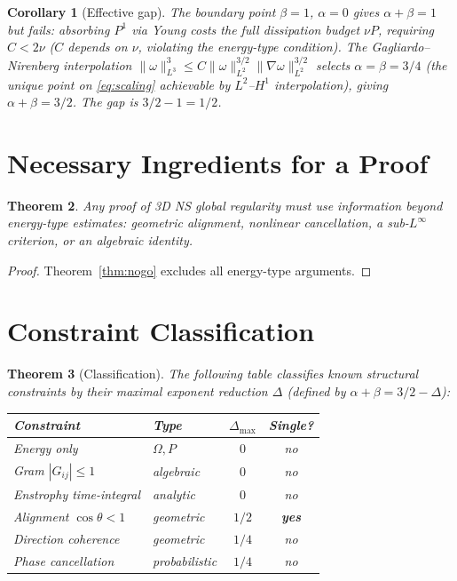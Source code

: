 \documentclass[12pt]{article}
\newtheorem{theorem}{Theorem}[section]
\newtheorem{corollary}[theorem]{Corollary}
\begin{document}
\begin{corollary}[Effective gap]\label{cor:gap}
The boundary point $\beta = 1$, $\alpha = 0$
gives $\alpha + \beta = 1$ but fails: absorbing
$P^1$ via Young costs the full dissipation
budget $\nu P$, requiring $C < 2\nu$
($C$ depends on $\nu$, violating the
energy-type condition).
The Gagliardo--Nirenberg interpolation
$\|\omega\|_{L^3}^3 \leq C
\|\omega\|_{L^2}^{3/2} \|\nabla\omega\|_{L^2}^{3/2}$
selects $\alpha = \beta = 3/4$ (the unique point
on \eqref{eq:scaling} achievable by $L^2$--$H^1$
interpolation), giving $\alpha + \beta = 3/2$.
The gap is $3/2 - 1 = 1/2$.
\end{corollary}

\section{Necessary Ingredients for a Proof}

\begin{theorem}\label{thm:necessary}
Any proof of 3D NS global regularity must use
information beyond energy-type estimates:
geometric alignment, nonlinear cancellation,
a sub-$L^\infty$ criterion, or an algebraic identity.
\end{theorem}

\begin{proof}
Theorem~\ref{thm:nogo} excludes all energy-type
arguments.
\end{proof}

\section{Constraint Classification}

\begin{theorem}[Classification]\label{thm:class}
The following table classifies known structural
constraints by their maximal exponent reduction
$\Delta$ (defined by $\alpha + \beta = 3/2 - \Delta$):

\begin{center}
\begin{tabular}{llcc}
\hline
Constraint & Type & $\Delta_{\max}$ & Single? \\
\hline
Energy only & $\Omega, P$ & $0$ & no \\
Gram $|G_{ij}| \leq 1$ & algebraic & $0$ & no \\
Enstrophy time-integral & analytic & $0$ & no \\
Alignment $\cos\theta < 1$ & geometric & $1/2$ & \textbf{yes} \\
Direction coherence & geometric & $1/4$ & no \\
Phase cancellation & probabilistic & $1/4$ & no \\
\hline
\end{tabular}
\end{center}
\end{theorem}
\end{document}
